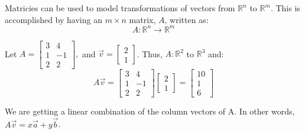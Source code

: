 \documentclass[../main.tex]{subfiles}
\begin{document}
Matricies can be used to model transformations of vectors from \( \mathbb{R}^n \) to \( \mathbb{R}^m \).
This is accomplished by having an \( m \times n \) matrix, \( A \), written as: \[ A: \mathbb{R}^n \rightarrow \mathbb{R}^m \]

\begin{example}
    
    Let \( A = \begin{bmatrix}
        3 & 4 \\
        1 & -1 \\
        2 & 2 
    \end{bmatrix}, \) and
    \( \vec{v} = \begin{bmatrix}
        2 \\
        1
    \end{bmatrix} \).
    Thus, \( A: \mathbb{R}^2 \) to \( \mathbb{R}^3 \) and:
    \[
        A\vec{v} = \begin{bmatrix}
            3 & 4 \\
            1 & -1 \\
            2 & 2 
        \end{bmatrix}
        \begin{bmatrix}
            2 \\
            1
        \end{bmatrix}
        =
        \begin{bmatrix}
            10 \\
            1 \\
            6
        \end{bmatrix}
    \]

    \begin{note}
        We are getting a linear combination of the column vectors of A.
        In other words, \( A \vec{v} = x \vec{a}+ y \vec{b} \).
    \end{note}
\end{example}
\end{document}
